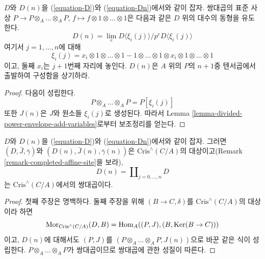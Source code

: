 \begin{lemma}
\label{lemma-structure-Dn}
$D$와 $D(n)$을 (\ref{equation-D})와 (\ref{equation-Dn})에서와 같이
잡자. 쌍대곱의 표준 사상
$P \to P \otimes_A \ldots \otimes_A P$,
$f \mapsto f \otimes 1 \otimes \ldots \otimes 1$은 다음과 같은
$D$ 위의 대수의 동형을 유도한다.
\begin{equation}
\label{equation-structure-Dn}
D(n) = \lim_e D\langle \xi_i(j) \rangle/p^eD\langle \xi_i(j) \rangle
\end{equation}
여기서 $j = 1, \ldots, n$에 대해
$$
\xi_i(j) = x_i \otimes 1 \otimes \ldots \otimes 1 -
1 \otimes \ldots \otimes 1 \otimes x_i \otimes 1 \otimes \ldots \otimes 1
$$
이고, 둘째 $x_i$는 $j + 1$번째 자리에 놓인다. $D(n)$은 $A$ 위의
$P$의 $n + 1$중 텐서곱에서 출발하여 구성함을 상기하라.
\end{lemma}

\begin{proof}
다음이 성립한다.
$$
P \otimes_A \ldots \otimes_A P = P[\xi_i(j)]
$$
또한 $J(n)$은 $J$와 원소들 $\xi_i(j)$로 생성된다. 따라서
Lemma \ref{lemma-divided-power-envelope-add-variables}로부터
보조정리를 얻는다.
\end{proof}

\begin{lemma}
\label{lemma-property-Dn}
$D$와 $D(n)$을 (\ref{equation-D})와 (\ref{equation-Dn})에서와 같이
잡자. 그러면 $(D, \bar J, \bar\gamma)$와
$(D(n), \bar J(n), \bar\gamma(n))$은
$\text{Cris}^\wedge(C/A)$의 대상이고(Remark
\ref{remark-completed-affine-site}을 보라),
$$
D(n) = \coprod\nolimits_{j = 0, \ldots, n} D
$$
는 $\text{Cris}^\wedge(C/A)$에서의 쌍대곱이다.
\end{lemma}

\begin{proof}
첫째 주장은 명백하다. 둘째 주장을 위해
$(B \to C, \delta)$를 $\text{Cris}^\wedge(C/A)$의 대상이라 하면
$$
\mathop{\mathrm{Mor}}\nolimits_{\text{Cris}^\wedge(C/A)}(D, B) =
\mathop{\mathrm{Hom}}\nolimits_A((P, J), (B, \mathop{\mathrm{Ker}}(B \to C)))
$$
이고, $D(n)$에 대해서도 $(P, J)$를
$(P \otimes_A \ldots \otimes_A P, J(n))$으로 바꾼 같은 식이
성립한다. $P \otimes_A \ldots \otimes_A P$가 쌍대곱이므로
쌍대곱에 관한 성질이 따른다.
\end{proof}

